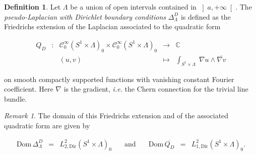 \documentclass{jams-l}
\theoremstyle{definition}
\newtheorem{definition}[theorem]{Definition}
\theoremstyle{remark}
\newtheorem{remark}[theorem]{Remark}
\numberwithin{equation}{section}
\begin{document}
        \begin{definition}
        
            Let $\Lambda$ be a union of open intervals contained in $\left] a, + \infty \right[$. The \textit{pseudo-Laplacian with Dirichlet boundary conditions} $\Delta^D_{\Lambda}$ is defined as the Friedrichs extension of the Laplacian associated to the quadratic form
            
            \[ \begin{array}{lllll}
                    Q_D & : & \mathcal{C}_0^{\infty} \left( S^1 \times \Lambda \right)_0 \times \mathcal{C}_0^{\infty} \left( S^1 \times \Lambda \right)_0 & \longrightarrow & \mathbb{C} \\[0.5em]
                    
                    && \left( u,v \right) & \longmapsto & \int_{S^1 \times \Lambda} \; \nabla u \wedge \overline{\nabla v}
                \end{array} \]
                
            \noindent on smooth compactly supported functions with vanishing constant Fourier coefficient. Here $\nabla$ is the gradient, \textit{i.e.} the Chern connection for the trivial line bundle.
        
        \end{definition}
        
        \begin{remark}
        
            The domain of this Friedrichs extension and of the associated quadratic form are given by
            
            \[ \begin{array}{lllclll}
                    \mathrm{Dom} \, \Delta^D_{\Lambda} & = & L_{2,\mathrm{Dir}}^2 \left( S^1 \times \Lambda \right)_0 & \quad \text{and} \quad & \mathrm{Dom} \, \overline{Q_D} & = & L_{1,\mathrm{Dir}}^2 \left( S^1 \times \Lambda \right)_0.
                \end{array} \]
        
        \end{remark}
        
\end{document}
